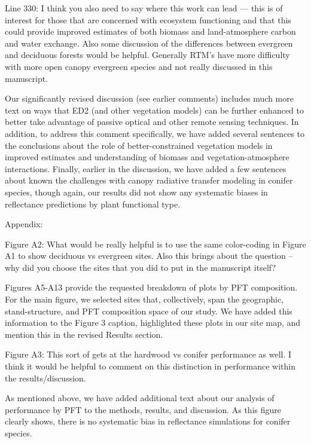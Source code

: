 \begin{reviewer}
  Line 330: I think you also need to say where this work can lead — this is of interest for those that are concerned with ecosystem functioning and that this could provide improved estimates of both biomass and land-atmosphere carbon and water exchange. Also some discussion of the differences between evergreen and deciduous forests would be helpful. Generally RTM’s have more difficulty with more open canopy evergreen species and not really discussed in this manuscript.
\end{reviewer}

Our significantly revised discussion (see earlier comments) includes much more text on ways that ED2 (and other vegetation models) can be further enhanced to better take advantage of passive optical and other remote sensing techniques. In addition, to address this comment specifically, we have added several sentences to the conclusions about the role of better-constrained vegetation models in improved estimates and understanding of biomass and vegetation-atmosphere interactions. Finally, earlier in the discussion, we have added a few sentences about known the challenges with canopy radiative transfer modeling in conifer species, though again, our results did not show any systematic biases in reflectance predictions by plant functional type.

\begin{reviewer}
Appendix:

Figure A2: What would be really helpful is to use the same color-coding in Figure A1 to show deciduous vs evergreen sites. Also this brings about the question – why did you choose the sites that you did to put in the manuscript itself?
\end{reviewer}

Figures A5-A13 provide the requested breakdown of plots by PFT composition. For the main figure, we selected sites that, collectively, span the geographic, stand-structure, and PFT composition space of our study. We have added this information to the Figure 3 caption, highlighted these plots in our site map, and mention this in the revised Results section.

\begin{reviewer}
  Figure A3: This sort of gets at the hardwood vs conifer performance as well. I think it would be helpful to comment on this distinction in performance within the results/discussion.
\end{reviewer}

As mentioned above, we have added additional text about our analysis of performance by PFT to the methods, results, and discussion. As this figure clearly shows, there is no systematic bias in reflectance simulations for conifer species.

